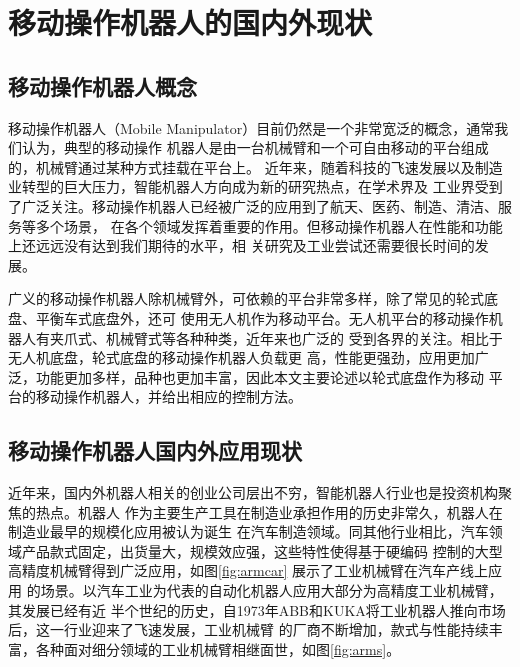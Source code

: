 
\chapter{移动操作机器人的国内外现状}
\label{cha:intro}

\section{移动操作机器人概念}
\label{cha:base_comcept}

移动操作机器人（Mobile Manipulator）目前仍然是一个非常宽泛的概念，通常我们认为，典型的移动操作
机器人是由一台机械臂和一个可自由移动的平台组成的，机械臂通过某种方式挂载在平台上\cite{bostelman2016survey}。
近年来，随着科技的飞速发展以及制造业转型的巨大压力，智能机器人方向成为新的研究热点，在学术界及
工业界受到了广泛关注\cite{schneier2015literature}。移动操作机器人已经被广泛的应用到了航天\cite{ambrose2004mobile}、医药、制造\cite{guizzo2011meka}、清洁、服务等多个场景，
在各个领域发挥着重要的作用。但移动操作机器人在性能和功能上还远远没有达到我们期待的水平，相
关研究及工业尝试还需要很长时间的发展。

广义的移动操作机器人除机械臂外，可依赖的平台非常多样，除了常见的轮式底盘、平衡车式底盘外，还可
使用无人机作为移动平台。无人机平台的移动操作机器人有夹爪式、机械臂式等各种种类，近年来也广泛的
受到各界的关注\cite{ruggiero2018aerial}。相比于无人机底盘，轮式底盘的移动操作机器人负载更
高，性能更强劲，应用更加广泛，功能更加多样，品种也更加丰富，因此本文主要论述以轮式底盘作为移动
平台的移动操作机器人，并给出相应的控制方法。

\section{移动操作机器人国内外应用现状}
\label{cha:application}

近年来，国内外机器人相关的创业公司层出不穷，智能机器人行业也是投资机构聚焦的热点。机器人
作为主要生产工具在制造业承担作用的历史非常久，机器人在制造业最早的规模化应用被认为诞生
在汽车制造领域。同其他行业相比，汽车领域产品款式固定，出货量大，规模效应强，这些特性使得基于硬编码
控制的大型高精度机械臂得到广泛应用，如图\ref{fig:armcar} 展示了工业机械臂在汽车产线上应用
的场景。以汽车工业为代表的自动化机器人应用大部分为高精度工业机械臂，其发展已经有近
半个世纪的历史，自1973年ABB和KUKA将工业机器人推向市场后，这一行业迎来了飞速发展，工业机械臂
的厂商不断增加，款式与性能持续丰富，各种面对细分领域的工业机械臂相继面世，如图\ref{fig:arms}。

